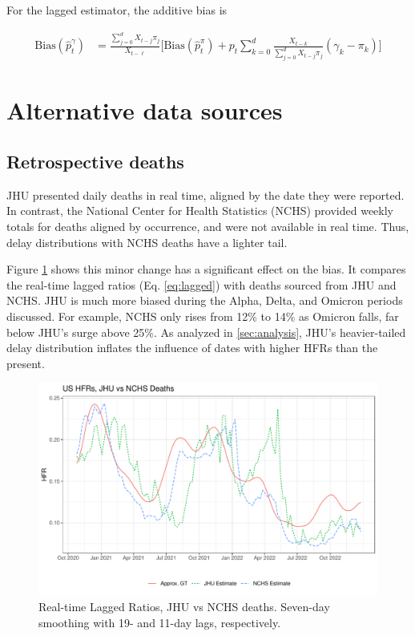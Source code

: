 \documentclass{article}
\begin{document}
For the lagged estimator, the additive bias is

\begin{align*}
         \text{Bias}(\hat{p}_t^\gamma) &=  \frac{\sum_{j=0}^d X_{t-j}\pi_j}{X_{t-\ell}}\Big[\text{Bias}(\hat{p}_t^\pi) + p_t\sum_{k=0}^d \frac{X_{t-k}}{\sum_{j=0}^d X_{t-j}\pi_j}(\gamma_k -\pi_k)\Big]
\end{align*}


\section{Alternative data sources}
\subsection{Retrospective deaths}\label{apx:NCHS_deaths}

JHU presented daily deaths in real time, aligned by the date they were reported. In contrast, the National Center for Health Statistics (NCHS) provided weekly totals for deaths aligned by occurrence, and were not available in real time. Thus, delay distributions with NCHS deaths have a lighter tail. 

Figure \ref{fig:jhu_vs_nchs} shows this minor change has a significant effect on the bias. It compares the real-time lagged ratios (Eq. \ref{eq:lagged}) with deaths sourced from JHU and NCHS. JHU is much more biased during the Alpha, Delta, and Omicron periods discussed. For example, NCHS only rises from 12\% to 14\% as Omicron falls, far below JHU's surge above 25\%. As analyzed in \ref{sec:analysis}, JHU's heavier-tailed delay distribution inflates the influence of dates with higher HFRs than the present.


\begin{figure}
    \centering
    \includegraphics[width=0.7\linewidth]{Figs/Real/jhu_vs_nchs.pdf}
    \caption{Real-time Lagged Ratios, JHU vs NCHS deaths. Seven-day smoothing with 19- and 11-day lags, respectively.}
    \label{fig:jhu_vs_nchs}
\end{figure}
\end{document}

